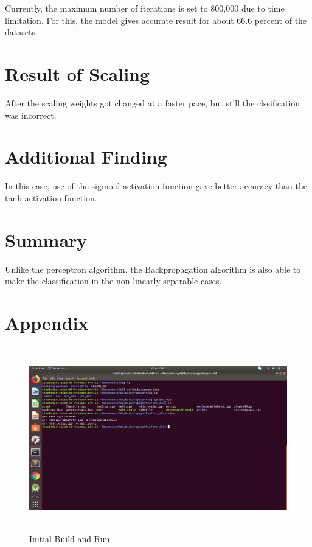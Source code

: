 \documentclass[letterpaper]{article}
\begin{document}
Currently, the maximum number of iterations is set to 800,000 due to time limitation. For this, the model gives accurate result for about 66.6 percent of the datasets. 

\section {Result of Scaling}
After the scaling weights got changed at a faster pace, but still the clssification was incorrect. 

\section {Additional Finding}
In this case, use of the sigmoid activation function gave better accuracy than the tanh activation function. 

\section {Summary}
  Unlike the perceptron algorithm, the Backpropagation algorithm is also able to make the classification in the non-linearly separable cases. 
  
\section {Appendix}

\begin{figure}[h]
\caption{Initial Build and Run}
\centering
\includegraphics[width=15cm,height=8cm]{1makefile.png}
\end{figure}
\end{document}
